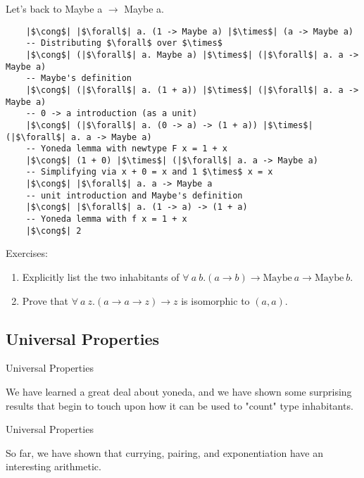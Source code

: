 \documentclass[tikz]{beamer}
\theoremstyle{definition}
\begin{document}
\begin{frame}[fragile]
Let's back to Maybe a $\rightarrow$ Maybe a.
\begin{verbatim}
    |$\cong$| |$\forall$| a. (1 -> Maybe a) |$\times$| (a -> Maybe a)
    -- Distributing $\forall$ over $\times$
    |$\cong$| (|$\forall$| a. Maybe a) |$\times$| (|$\forall$| a. a -> Maybe a)
    -- Maybe's definition
    |$\cong$| (|$\forall$| a. (1 + a)) |$\times$| (|$\forall$| a. a -> Maybe a)
    -- 0 -> a introduction (as a unit)
    |$\cong$| (|$\forall$| a. (0 -> a) -> (1 + a)) |$\times$| (|$\forall$| a. a -> Maybe a)
    -- Yoneda lemma with newtype F x = 1 + x
    |$\cong$| (1 + 0) |$\times$| (|$\forall$| a. a -> Maybe a)
    -- Simplifying via x + 0 = x and 1 $\times$ x = x
    |$\cong$| |$\forall$| a. a -> Maybe a
    -- unit introduction and Maybe's definition
    |$\cong$| |$\forall$| a. (1 -> a) -> (1 + a)
    -- Yoneda lemma with f x = 1 + x
    |$\cong$| 2
\end{verbatim}
\end{frame}

\begin{frame}[fragile]
Exercises: 
\begin{enumerate}
    \item Explicitly list the two inhabitants of $\forall~a~b. (a \to b) \to \text{Maybe}~a \to \text{Maybe}~b$.
    \item Prove that $\forall~a~z. (a \to a \to z) \to z$ is isomorphic to $(a, a)$.
\end{enumerate}
\end{frame}

\subsection{Universal Properties}

\begin{frame}{Universal Properties}

We have learned a great deal about yoneda, and we have shown some surprising results that begin to touch upon how it can be used to "count" type inhabitants. 
\end{frame}

\begin{frame}{Universal Properties}

So far, we have shown that currying, pairing, and exponentiation have an interesting arithmetic. 

\end{frame}
\end{document}
